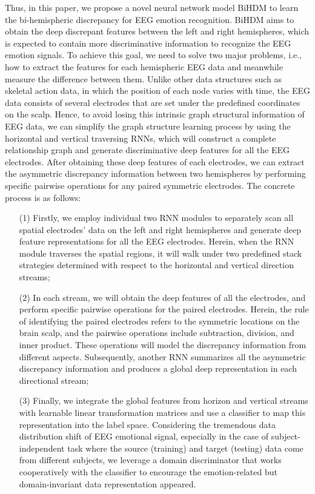 \documentclass[journal]{IEEEtran}
\begin{document}
Thus, in this paper, we propose a novel neural network model BiHDM to learn the bi-hemispheric discrepancy for EEG emotion recognition. BiHDM aims to obtain the deep discrepant features between the left and right hemispheres, which is expected to contain more discriminative information to recognize the EEG emotion signals. To achieve this goal, we need to solve two major problems, i.e., how to extract the features for each hemispheric EEG data and meanwhile measure the difference between them. Unlike other data structures such as skeletal action data, in which the position of each node varies with time, the EEG data consists of several electrodes that are set under the predefined coordinates on the scalp. Hence, to avoid losing this intrinsic graph structural information of EEG data, we can simplify the graph structure learning process by using the horizontal and vertical traversing RNNs, which will construct a complete relationship graph and generate discriminative deep features for all the EEG electrodes. After obtaining these deep features of each electrodes, we can extract the asymmetric discrepancy information between two hemispheres by performing specific pairwise operations for any paired symmetric electrodes. The concrete process is as follows:
\begin{itemize}
	\item [(1)] Firstly, we employ individual two RNN modules to separately scan all spatial electrodes' data on the left and right hemispheres and generate deep feature representations for all the EEG electrodes. Herein, when the RNN module traverses the spatial regions, it will walk under two predefined stack strategies determined with respect to the horizontal and vertical direction streams;
	\item [(2)] In each stream, we will obtain the deep features of all the electrodes, and perform specific pairwise operations for the paired electrodes. Herein, the rule of identifying the paired electrodes refers to the symmetric locations on the brain scalp, and the pairwise operations include subtraction, division, and inner product. These operations will model the discrepancy information from different aspects. Subsequently, another RNN summarizes all the asymmetric discrepancy information and produces a global deep representation in each directional stream;
	\item [(3)] Finally, we integrate the global features from horizon and vertical streams with learnable linear transformation matrices and use a classifier to map this representation into the label space. Considering the tremendous data distribution shift of EEG emotional signal, especially in the case of subject-independent task where the source (training) and target (testing) data come from different subjects, we leverage a domain discriminator that works cooperatively with the classifier to encourage the emotion-related but domain-invariant data representation appeared.
\end{itemize}
\end{document}
